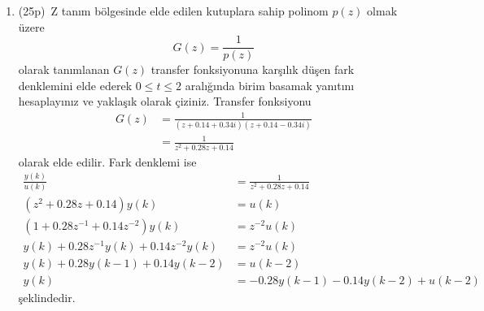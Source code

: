 \begin{enumerate}[\bfseries S1.]
\begin{enumerate}
        \item(25p)\, Z tanım bölgesinde elde edilen kutuplara sahip polinom $p(z)$ olmak üzere
        \begin{equation}
            G(z)=\frac{1}{p(z)}
        \end{equation}
        olarak tanımlanan $G(z)$ transfer fonksiyonuna karşılık düşen fark denklemini elde ederek $0\leq t\leq 2$ aralığında birim basamak yanıtını hesaplayınız ve yaklaşık olarak çiziniz. 
        Transfer fonksiyonu
        \begin{equation}
        \begin{split}
            G(z)&=\frac{1}{(z+0.14+0.34i)(z+0.14-0.34i)}\\
            &=\frac{1}{z^2+0.28z+0.14}
        \end{split}
        \end{equation}
        olarak elde edilir. Fark denklemi ise 
        \begin{equation}
            \begin{split}
                \frac{y(k)}{u(k)}&=\frac{1}{z^2+0.28z+0.14}\\
                (z^2+0.28z+0.14)y(k)&=u(k)\\
                (1+0.28z^{-1}+0.14z^{-2})y(k)&=z^{-2}u(k)\\
                y(k)+0.28z^{-1}y(k)+0.14z^{-2}y(k)&=z^{-2}u(k)\\
                y(k)+0.28y(k-1)+0.14y(k-2)&=u(k-2)\\
                y(k)&=-0.28y(k-1)-0.14y(k-2)+u(k-2)
            \end{split}
        \end{equation}
        şeklindedir.

        \begin{center}
        \end{center}
    \end{enumerate}
    

\end{enumerate}

